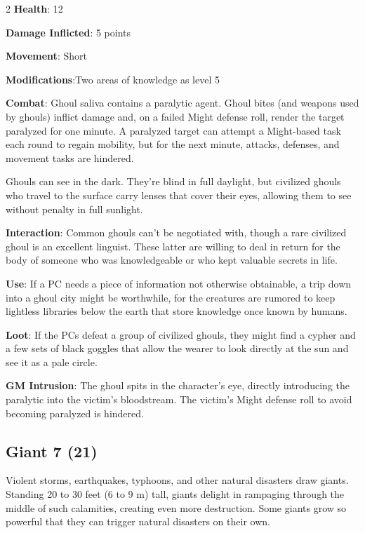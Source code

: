 \begin{multicols}{2}
\textbf{Health}: 12

\textbf{Damage Inflicted}: 5 points

\textbf{Movement}: Short

\textbf{Modifications}:Two areas of knowledge as level 5

\textbf{Combat}: Ghoul saliva contains a paralytic agent. Ghoul bites (and weapons used by ghouls) inflict damage and, on a failed Might defense roll, render the target paralyzed for one minute. A paralyzed target can attempt a Might-based task each round to regain mobility, but for the next minute, attacks, defenses, and movement tasks are hindered.

Ghouls can see in the dark. They’re blind in full daylight, but civilized ghouls who travel to the surface carry lenses that cover their eyes, allowing them to see without penalty in full sunlight.

\textbf{Interaction}: Common ghouls can’t be negotiated with, though a rare civilized ghoul is an excellent linguist. These latter are willing to deal in return for the body of someone who was knowledgeable or who kept valuable secrets in life.

\textbf{Use}: If a PC needs a piece of information not otherwise obtainable, a trip down into a ghoul city might be worthwhile, for the creatures are rumored to keep lightless libraries below the earth that store knowledge once known by humans.

\textbf{Loot}: If the PCs defeat a group of civilized ghouls, they might find a cypher and a few sets of black goggles that allow the wearer to look directly at the sun and see it as a pale circle.

\textbf{GM Intrusion}: The ghoul spits in the character’s eye, directly introducing the paralytic into the victim’s bloodstream. The victim’s Might defense roll to avoid becoming paralyzed is hindered.

\subsection{Giant	7 (21)}

Violent storms, earthquakes, typhoons, and other natural disasters draw giants. Standing 20 to 30 feet (6 to 9 m) tall, giants delight in rampaging through the middle of such calamities, creating even more destruction. Some giants grow so powerful that they can trigger natural disasters on their own.


\end{multicols}
